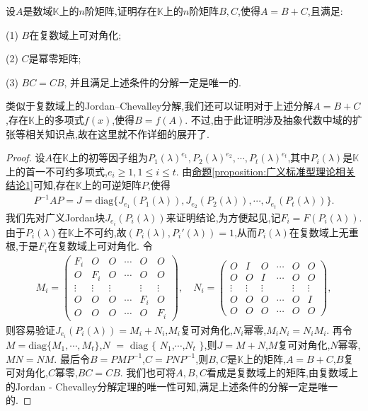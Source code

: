 \documentclass[../../main.tex]{subfiles}%
\begin{document}
\begin{theorem}\label{theorem:数K上的Jordan-Chevalley分解}
设$A$是数域$\mathbb{K}$上的$n$阶矩阵,证明存在$\mathbb{K}$上的$n$阶矩阵$B,C$,使得$A = B + C$,且满足:

(1) $B$在复数域上可对角化; 

(2) $C$是幂零矩阵; 

(3) $BC = CB$,
并且满足上述条件的分解一定是唯一的.
\end{theorem}
\begin{remark}
类似于复数域上的Jordan--Chevalley分解,我们还可以证明对于上述分解$A = B + C$,存在$\mathbb{K}$上的多项式$f(x)$,使得$B = f(A)$. 不过,由于此证明涉及抽象代数中域的扩张等相关知识点,故在这里就不作详细的展开了. 
\end{remark}
\begin{proof}

设$A$在$\mathbb{K}$上的初等因子组为$P_1(\lambda)^{e_1},P_2(\lambda)^{e_2},\cdots,P_t(\lambda)^{e_t}$,其中$P_i(\lambda)$是$\mathbb{K}$上的首一不可约多项式,$e_i\geqslant 1, 1\leqslant i\leqslant t$. 由\hyperref[proposition:广义标准型理论相关结论1]{命题\ref{proposition:广义标准型理论相关结论1}}可知,存在$\mathbb{K}$上的可逆矩阵$P$,使得
\begin{align*}
P^{-1}AP = J=\mathrm{diag}\{J_{e_1}(P_1(\lambda)),J_{e_2}(P_2(\lambda)),\cdots,J_{e_t}(P_t(\lambda))\}.
\end{align*}
我们先对广义Jordan块$J_{e_i}(P_i(\lambda))$来证明结论,为方便起见,记$F_i = F(P_i(\lambda))$. 由于$P_i(\lambda)$在$\mathbb{K}$上不可约,故$(P_i(\lambda),P_i'(\lambda)) = 1$,从而$P_i(\lambda)$在复数域上无重根,于是$F_i$在复数域上可对角化. 令
\begin{align*}
M_i = 
\begin{pmatrix}
F_i & O & O & \cdots & O & O \\
O & F_i & O & \cdots & O & O \\
\vdots & \vdots & \vdots & & \vdots & \vdots \\
O & O & O & \cdots & F_i & O \\
O & O & O & \cdots & O & F_i
\end{pmatrix}, \quad 
N_i = 
\begin{pmatrix}
O & I & O & \cdots & O & O \\
O & O & I & \cdots & O & O \\
\vdots & \vdots & \vdots & & \vdots & \vdots \\
O & O & O & \cdots & O & I \\
O & O & O & \cdots & O & O
\end{pmatrix},
\end{align*}
则容易验证$J_{e_i}(P_i(\lambda)) = M_i + N_i$,$M_i$复可对角化,$N_i$幂零,$M_iN_i = N_iM_i$. 再令$M = \mathrm{diag}\{M_1,\cdots,M_t\}$,$N $ $=$ $\mathrm{diag}$ $\{$ $N_1$,$\cdots$,$N_t$ $\}$,则$J = M + N$,$M$复可对角化,$N$幂零,$MN = NM$. 最后令$B = PMP^{-1}$,$C = PNP^{-1}$,则$B,C$是$\mathbb{K}$上的矩阵,$A = B + C$,$B$复可对角化,$C$幂零,$BC = CB$. 我们也可将$A,B,C$看成是复数域上的矩阵,由复数域上的Jordan - Chevalley分解定理的唯一性可知,满足上述条件的分解一定是唯一的. 

\end{proof}
\end{document}
